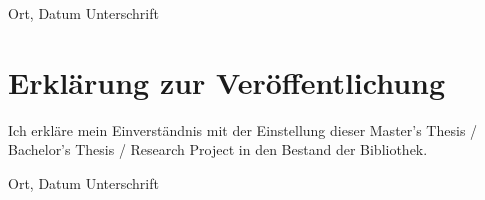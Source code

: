 \documentclass[12pt,final,twoside]{report}
\newcommand{\trtype}{Master's Thesis / Bachelor's Thesis / Research Project} %
\theoremstyle{plain}
\theoremstyle{definition}
\theoremstyle{remark}
\begin{document}
\vspace{4cm}
\noindent Ort, Datum \hfill Unterschrift

\newpage
\thispagestyle{empty}
\hspace{1cm}
\newpage

\vspace{2cm}
\chapter*{Erkl\"arung zur Ver\"offentlichung}
\label{sec:urheber}
Ich erkl\"are mein Einverst\"andnis mit der Einstellung dieser \trtype{} in den Bestand der Bibliothek.

\vspace{4cm}
\noindent Ort, Datum \hfill Unterschrift

\newpage
\thispagestyle{empty}
\hspace{1cm}
\newpage
\end{document}
